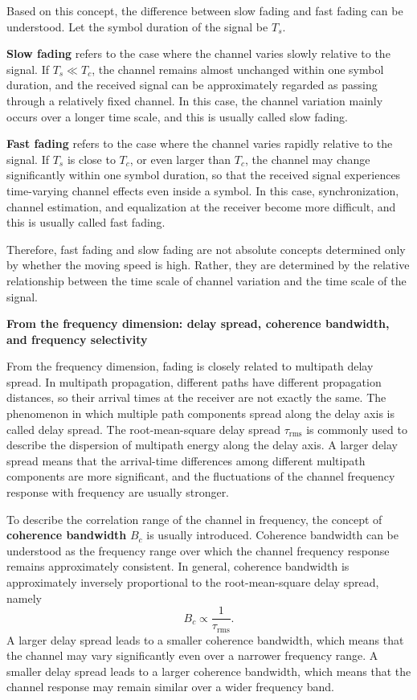 Based on this concept,
the difference between slow fading and fast fading can be understood.
Let the symbol duration of the signal be \(T_s\).

\textbf{Slow fading} refers to the case where the channel varies slowly relative to the signal.
If \(T_s \ll T_c\),
the channel remains almost unchanged within one symbol duration,
and the received signal can be approximately regarded as passing through a relatively fixed channel.
In this case,
the channel variation mainly occurs over a longer time scale,
and this is usually called slow fading.

\textbf{Fast fading} refers to the case where the channel varies rapidly relative to the signal.
If \(T_s\) is close to \(T_c\),
or even larger than \(T_c\),
the channel may change significantly within one symbol duration,
so that the received signal experiences time-varying channel effects even inside a symbol.
In this case,
synchronization,
channel estimation,
and equalization at the receiver become more difficult,
and this is usually called fast fading.

Therefore,
fast fading and slow fading are not absolute concepts determined only by whether the moving speed is high.
Rather,
they are determined by the relative relationship between the time scale of channel variation
and the time scale of the signal.

\noindent\textbullet\quad\textbf{From the frequency dimension: delay spread, coherence bandwidth, and frequency selectivity}

From the frequency dimension,
fading is closely related to multipath delay spread.
In multipath propagation,
different paths have different propagation distances,
so their arrival times at the receiver are not exactly the same.
The phenomenon in which multiple path components spread along the delay axis is called delay spread.
The root-mean-square delay spread \(\tau_{\mathrm{rms}}\) is commonly used
to describe the dispersion of multipath energy along the delay axis.
A larger delay spread means that the arrival-time differences among different multipath components are more significant,
and the fluctuations of the channel frequency response with frequency are usually stronger.

To describe the correlation range of the channel in frequency,
the concept of \textbf{coherence bandwidth} \(B_c\) is usually introduced.
Coherence bandwidth can be understood as the frequency range over which the channel frequency response remains approximately consistent.
In general,
coherence bandwidth is approximately inversely proportional to the root-mean-square delay spread,
namely
\begin{equation}
    B_c
    \propto
    \frac{1}{\tau_{\mathrm{rms}}}.
    \label{eq:coherence-bandwidth}
\end{equation}
A larger delay spread leads to a smaller coherence bandwidth,
which means that the channel may vary significantly even over a narrower frequency range.
A smaller delay spread leads to a larger coherence bandwidth,
which means that the channel response may remain similar over a wider frequency band.

